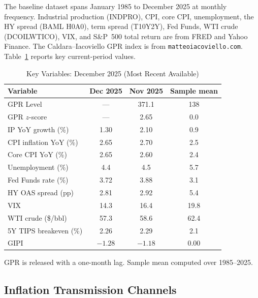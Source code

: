 \documentclass[12pt]{article}
\begin{document}
The baseline dataset spans January 1985 to December 2025 at monthly frequency.
Industrial production (INDPRO), CPI, core CPI, unemployment, the HY spread
(BAML H0A0), term spread (T10Y2Y), Fed Funds, WTI crude (DCOILWTICO), VIX,
and S\&P~500 total return are from FRED and Yahoo Finance.
The Caldara--Iacoviello GPR index is from \texttt{matteoiacoviello.com}.
Table~\ref{tab:desc} reports key current-period values.

\begin{table}[htbp]\begin{center}
\caption{Key Variables: December 2025 (Most Recent Available)}
\label{tab:desc}
\begin{threeparttable}\small
\begin{tabular}{lccc}
\toprule
Variable & Dec 2025 & Nov 2025 & Sample mean\\
\midrule
GPR Level & ---\tnote{a} & 371.1 & 138\\
GPR $z$-score & --- & 2.65 & 0.0\\
IP YoY growth (\%) & 1.30 & 2.10 & 0.9\\
CPI inflation YoY (\%) & 2.65 & 2.70 & 2.5\\
Core CPI YoY (\%) & 2.65 & 2.60 & 2.4\\
Unemployment (\%) & 4.4 & 4.5 & 5.7\\
Fed Funds rate (\%) & 3.72 & 3.88 & 3.1\\
HY OAS spread (pp) & 2.81 & 2.92 & 5.4\\
VIX & 14.3 & 16.4 & 19.8\\
WTI crude (\$/bbl) & 57.3 & 58.6 & 62.4\\
5Y TIPS breakeven (\%) & 2.26 & 2.29 & 2.1\\
GIPI & $-1.28$ & $-1.18$ & 0.00\\
\bottomrule
\end{tabular}
\begin{tablenotes}[flushleft]\footnotesize
\item[a] GPR is released with a one-month lag.
Sample mean computed over 1985--2025.
\end{tablenotes}
\end{threeparttable}
\end{center}\end{table}

\subsection{Inflation Transmission Channels}
\end{document}
